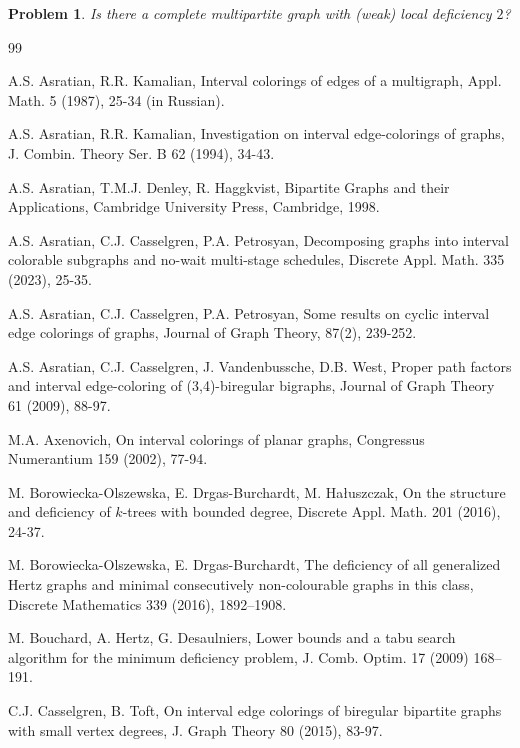 \documentclass[12pt]{article}
\theoremstyle{plain}
\newtheorem{problem}[theorem]{Problem}
\theoremstyle{definition}
\numberwithin{equation}{section}
\begin{document}
\begin{problem}
Is there a complete multipartite graph with (weak) local deficiency $2$?
\end{problem}




 
\begin{thebibliography}{99}

 A.S. Asratian, R.R. Kamalian, Interval colorings of edges of a multigraph, Appl. Math. 5 (1987), 25-34 (in Russian).

 A.S. Asratian, R.R. Kamalian, Investigation on interval
edge-colorings of graphs, J. Combin. Theory Ser. B 62 (1994), 34-43.

 A.S. Asratian, T.M.J. Denley, R. Haggkvist, Bipartite Graphs and their Applications, Cambridge University Press, Cambridge, 1998.

 A.S. Asratian, C.J. Casselgren, P.A. Petrosyan, Decomposing graphs into interval colorable subgraphs
and no-wait multi-stage schedules, Discrete Appl. Math. 335 (2023), 25-35.


 A.S. Asratian, C.J. Casselgren, P.A. Petrosyan,
Some results on cyclic interval edge colorings of
graphs,
 Journal of Graph Theory, 87(2), 239-252.

A.S. Asratian, C.J. Casselgren, J. Vandenbussche, D.B. West,
Proper path factors and interval edge-coloring of (3,4)-biregular bigraphs,
Journal of Graph Theory 61 (2009), 88-97.

 M.A. Axenovich, On interval colorings of planar graphs, Congressus Numerantium 159 (2002), 77-94.

 M. Borowiecka-Olszewska, E. Drgas-Burchardt, M. Ha\l uszczak, On the structure and deficiency of $k$-trees with bounded degree, Discrete Appl. Math. 201 (2016), 24-37.

M. Borowiecka-Olszewska, E. Drgas-Burchardt,
The deficiency of all generalized Hertz graphs and minimal consecutively non-colourable graphs in this class,
Discrete Mathematics 339 (2016), 1892--1908.

 M. Bouchard, A. Hertz, G. Desaulniers, Lower bounds and a tabu search algorithm for the minimum deficiency problem, J. Comb. Optim. 17 (2009) 168–191.

 C.J. Casselgren, B. Toft, On interval edge colorings of biregular bipartite graphs with small vertex degrees, J. Graph Theory 80 (2015), 83-97.


\end{thebibliography}
\end{document}
